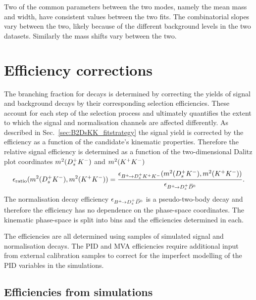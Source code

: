 Two of the common parameters between the two modes, namely the mean \Bp mass and width, have consistent values between the two fits. The combinatorial slopes vary between the two, likely because of the different background levels in the two datasets. Similarly the mass shifts vary between the two. 

\section{Efficiency corrections}
\label{sec:B2DsKK_effcorrection}

The branching fraction for \decay{\Bp}{\Dsp\Kp\Km} decays is determined by correcting the yields of signal and background decays by their corresponding selection efficiencies. These account for each step of the selection process and ultimately quantifies the extent to which the signal and normalisation channels are affected differently. As described in Sec.~\ref{sec:B2DsKK_fitstrategy} the signal yield is corrected by the efficiency as a function of the candidate's kinematic properties. Therefore the relative signal efficiency is determined as a function of the two-dimensional Dalitz plot coordinates $m^{2}({{D}^+_{s}}{{K}^-})$ and $m^{2}({{K}^+}{{K}^-})$
\begin{equation}
\epsilon_{\text{ratio}}(m^{2}({{D}^+_{s}}{{K}^-}),m^{2}({{K}^+}{{K}^-})) = \frac{\epsilon_{{{{B}^+}}\!\rightarrow {\ensuremath{{D}^+_{s}}}{\ensuremath{{K}^+}}{\ensuremath{{K}^-}}}(m^{2}({{D}^+_{s}}{{K}^-}),m^{2}({{K}^+}{{K}^-}))}{\epsilon_{{{{B}^+}}\!\rightarrow {\ensuremath{{D}^+_{s}}}{\ensuremath{{\kern 0.2em\overline{\kern -0.2em D}{}}{}^0}}}}.
\end{equation}
The normalisation decay efficiency $\epsilon_{{{{B}^+}}\!\rightarrow {\ensuremath{{D}^+_{s}}}{\ensuremath{{\kern 0.2em\overline{\kern -0.2em D}{}}{}^0}}}$ is a pseudo-two-body decay and therefore the efficiency has no dependence on the phase-space coordinates. The kinematic phase-space is split into bins and the efficiencies determined in each. 


The efficiencies are all determined using samples of simulated signal and normalisation decays. The PID and MVA efficiencies require additional input from external calibration samples to correct for the imperfect modelling of the PID variables in the simulations.

\subsection{Efficiencies from simulations} 

